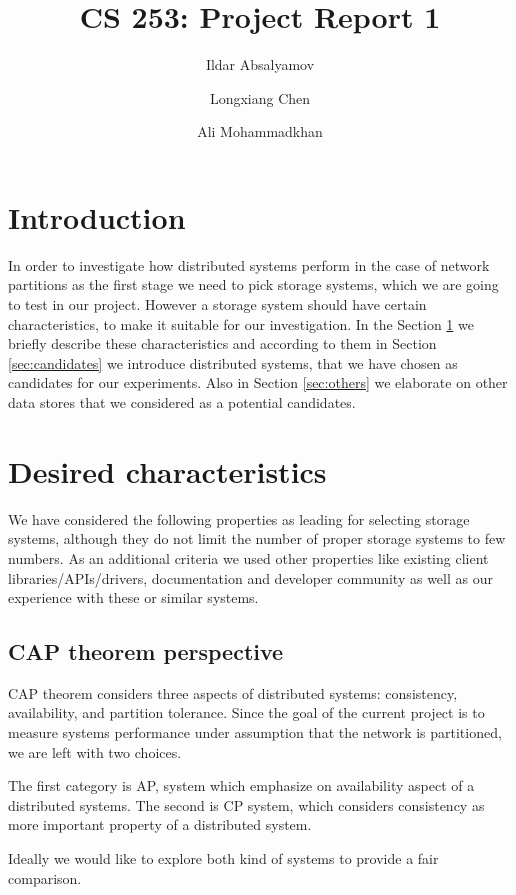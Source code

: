 \documentclass[a4paper]{article}
\title{CS 253: Project Report 1}
\author{Ildar Absalyamov \and Longxiang Chen \and Ali Mohammadkhan}
\begin{document}
\maketitle

\section*{Introduction}

In order to investigate how distributed systems perform in the case of network partitions as the first stage we need to pick storage systems, which we are going to test in our project.
However a storage system should have certain characteristics, to make it suitable for our investigation. 
In the Section \ref{sec:characteristic} we briefly describe these characteristics and according to them in Section \ref{sec:candidates} we introduce distributed systems, that we have chosen as candidates for our experiments.
Also in Section \ref{sec:others} we elaborate on other data stores that we considered as a potential candidates. 

\section{Desired characteristics}
\label{sec:characteristic}
We have considered the following properties as leading for selecting storage systems, although they do not limit the number of proper storage systems to few numbers.
As an additional criteria we used other properties like existing client libraries/APIs/drivers, documentation and developer community as well as our experience with these or similar systems.

\subsection*{CAP theorem perspective}
CAP theorem considers three aspects of distributed systems: consistency, availability, and partition tolerance. 
Since the goal of the current project is to measure systems performance under assumption that the network is partitioned, we are left with two choices. 

The first category is AP, system which emphasize on availability aspect of a distributed systems. 
The second is CP system, which considers consistency as more important property of a distributed system.

Ideally we would like to explore both kind of systems to provide a fair comparison.
\end{document}
